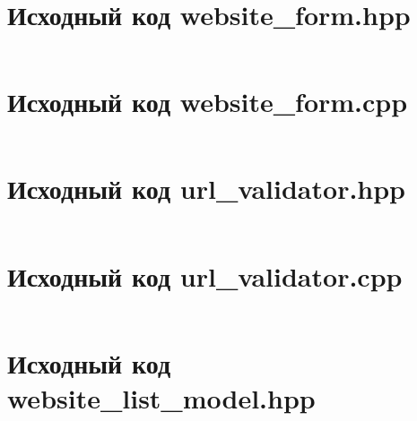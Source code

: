 \documentclass[a4paper, 14pt]{extarticle}
\newenvironment{code}{\captionsetup{type=listing}}{}
\begin{document}
\begin{code}
  \inputminted{cpp}{../task-3/src/main.cpp}
\end{code}

\newpage

\section{Исходный код website\_form.hpp}
\label{app:website_form.hpp}

\begin{code}
  \inputminted{cpp}{../task-3/src/website_form.hpp}
\end{code}

\newpage

\section{Исходный код website\_form.cpp}
\label{app:website_form.cpp}

\begin{code}
  \inputminted{cpp}{../task-3/src/website_form.cpp}
\end{code}

\newpage

\section{Исходный код url\_validator.hpp}
\label{app:url_validator.hpp}

\begin{code}
  \inputminted{cpp}{../task-3/src/url_validator.hpp}
\end{code}

\newpage

\section{Исходный код url\_validator.cpp}
\label{app:url_validator.cpp}

\begin{code}
  \inputminted{cpp}{../task-3/src/url_validator.cpp}
\end{code}

\newpage

\section{Исходный код website\_list\_model.hpp}
\label{app:website_list_model.hpp}
\end{document}
